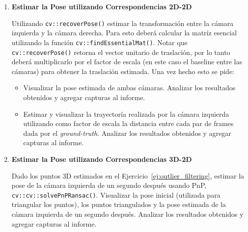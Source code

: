 \documentclass[tp]{lcc}
\begin{document}
\begin{enumerate}
\item \textbf{Estimar la Pose utilizando Correspondencias 2D-2D}

Utilizando \lstinline{cv::recoverPose()} estimar la transformación entre la cámara izquierda y la cámara derecha. Para esto deberá calcular la matríz esencial utilizando la función \lstinline{cv::findEssentialMat()}. Notar que \lstinline{cv::recoverPose()} retorna el vector unitario de traslación, por lo tanto deberá multiplicarlo por el factor de escala (en este caso el baseline entre las cámaras) para obtener la traslación estimada. Una vez hecho esto se pide:

\begin{itemize}
    \item Visualizar la pose estimada de ambas cámaras. Analizar los resultados obtenidos y agregar capturas al informe.
    \item Estimar y visualizar la trayectoría realizada por la cámara izquierda utilizando como factor de escala la distancia entre cada par de frames dada por el \emph{ground-truth}. Analizar los resultados obtenidos y agregar capturas al informe.
\end{itemize}

\item \textbf{Estimar la Pose utilizando Correspondencias 3D-2D}

Dado los puntos 3D estimados en el Ejercicio~\ref{ej:outlier_filtering}, estimar la pose de la cámara izquierda de un segundo después usando PnP, \lstinline{cv::cv::solvePnPRansac()}. Visualizar la pose inicial (utilizada para triangular los puntos), los puntos triangulados y la pose estimada de la cámara izquierda de un segundo después. Analizar los resultados obtenidos y agregar capturas al informe.

\end{enumerate}
\end{document}
